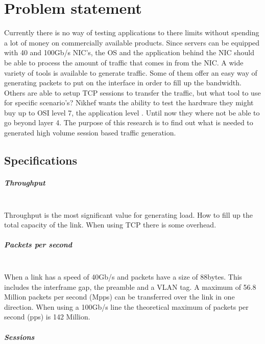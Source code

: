 \chapter{Problem statement}\label{ch:problem}
Currently there is no way of testing applications to there limits without spending a lot of money on commercially available products. 
Since servers can be equipped with 40 and 100Gb/s NIC's, the OS and the application behind the NIC should be able to process the amount of traffic that comes in from the NIC. 
A wide variety of tools is available to generate traffic. Some of them offer an easy way of generating packets to put on the interface in order to fill up the bandwidth. 
Others are able to setup TCP sessions to transfer the traffic, but what tool to use for specific scenario's?   
Nikhef wants the ability to test the hardware they might buy up to OSI level 7, the application level . Until now they where not be able to go beyond layer 4. The purpose of this research is to find out what is needed to generated high volume session based traffic generation.

\section{Specifications}\label{sec:specifications}
\paragraph{Throughput}\mbox{}\\
Throughput is the most significant value for generating load. How to fill up the total capacity of the link. When using TCP there is some overhead.

\paragraph{Packets per second}\label{par:requnused}\mbox{}\\
When a link has a speed of 40Gb/s and packets have a size of 88bytes. This includes the interframe gap, the preamble and a VLAN tag. A maximum of 56.8 Million packets per second (Mpps) can be transferred over the link in one direction. When using a 100Gb/s line the theoretical maximum of packets per second (pps) is 142 Million.  

\paragraph{Sessions}\label{par:legitmoas}\mbox{}\\

